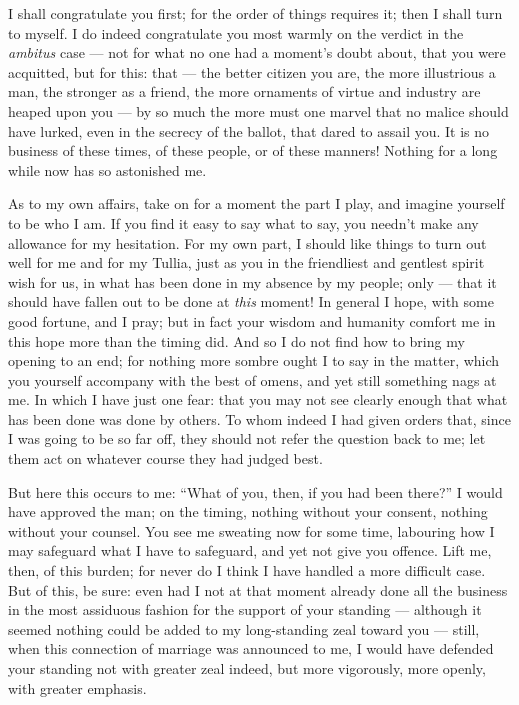 

 I shall congratulate you first; for the order of things requires it; then I shall turn to myself. I do indeed congratulate you most warmly on the verdict in the \textit{ambitus} case --- not for what no one had a moment's doubt about, that you were acquitted, but for this: that --- the better citizen you are, the more illustrious a man, the stronger as a friend, the more ornaments of virtue and industry are heaped upon you --- by so much the more must one marvel that no malice should have lurked, even in the secrecy of the ballot, that dared to assail you. It is no business of these times, of these people, or of these manners! Nothing for a long while now has so astonished me.

 As to my own affairs, take on for a moment the part I play, and imagine yourself to be who I am. If you find it easy to say what to say, you needn't make any allowance for my hesitation. For my own part, I should like things to turn out well for me and for my Tullia, just as you in the friendliest and gentlest spirit wish for us, in what has been done in my absence by my people; only --- that it should have fallen out to be done at \textit{this} moment! In general I hope, with some good fortune, and I pray; but in fact your wisdom and humanity comfort me in this hope more than the timing did. And so I do not find how to bring my opening to an end; for nothing more sombre ought I to say in the matter, which you yourself accompany with the best of omens, and yet still something nags at me. In which I have just one fear: that you may not see clearly enough that what has been done was done by others. To whom indeed I had given orders that, since I was going to be so far off, they should not refer the question back to me; let them act on whatever course they had judged best.

 But here this occurs to me: ``What of you, then, if you had been there?'' I would have approved the man; on the timing, nothing without your consent, nothing without your counsel. You see me sweating now for some time, labouring how I may safeguard what I have to safeguard, and yet not give you offence. Lift me, then, of this burden; for never do I think I have handled a more difficult case. But of this, be sure: even had I not at that moment already done all the business in the most assiduous fashion for the support of your standing --- although it seemed nothing could be added to my long-standing zeal toward you --- still, when this connection of marriage was announced to me, I would have defended your standing not with greater zeal indeed, but more vigorously, more openly, with greater emphasis.

